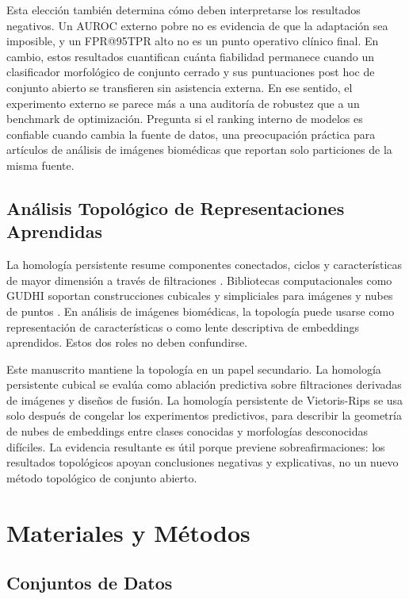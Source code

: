 \documentclass[11pt]{article}
\begin{document}
Esta elección también determina cómo deben interpretarse los resultados negativos. Un AUROC externo pobre no es evidencia de que la adaptación sea imposible, y un FPR@95TPR alto no es un punto operativo clínico final. En cambio, estos resultados cuantifican cuánta fiabilidad permanece cuando un clasificador morfológico de conjunto cerrado y sus puntuaciones post hoc de conjunto abierto se transfieren sin asistencia externa. En ese sentido, el experimento externo se parece más a una auditoría de robustez que a un benchmark de optimización. Pregunta si el ranking interno de modelos es confiable cuando cambia la fuente de datos, una preocupación práctica para artículos de análisis de imágenes biomédicas que reportan solo particiones de la misma fuente.

\subsection{Análisis Topológico de Representaciones Aprendidas}

La homología persistente resume componentes conectados, ciclos y características de mayor dimensión a través de filtraciones \cite{edelsbrunner2002_persistence,carlsson2009_topology}. Bibliotecas computacionales como GUDHI soportan construcciones cubicales y simpliciales para imágenes y nubes de puntos \cite{maria2014_gudhi}. En análisis de imágenes biomédicas, la topología puede usarse como representación de características o como lente descriptiva de embeddings aprendidos. Estos dos roles no deben confundirse.

Este manuscrito mantiene la topología en un papel secundario. La homología persistente cubical se evalúa como ablación predictiva sobre filtraciones derivadas de imágenes y diseños de fusión. La homología persistente de Vietoris-Rips se usa solo después de congelar los experimentos predictivos, para describir la geometría de nubes de embeddings entre clases conocidas y morfologías desconocidas difíciles. La evidencia resultante es útil porque previene sobreafirmaciones: los resultados topológicos apoyan conclusiones negativas y explicativas, no un nuevo método topológico de conjunto abierto.

\section{Materiales y Métodos}

\subsection{Conjuntos de Datos}
\end{document}
